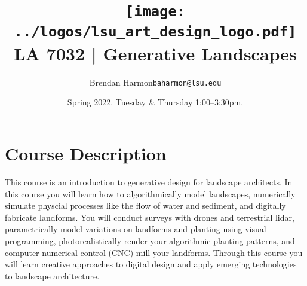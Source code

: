 \documentclass[11pt,article,oneside]{memoir}
\makeatletter
\def\myauthor{Author}
\def\mytitle{Title}
\def\myemail{baharmon@lsu.edu}
\def\myauthor{Brendan Harmon}
\def\mytitle{ \texttt{[image: ../logos/lsu\_art\_design\_logo.pdf]} \\[0.1cm] {\normalfont \normalsize LA 7032 |} \Large Generative Landscapes}
\newcommand{\globalcolor}[1]{%
  \color{#1}\global\let\default@color\current@color
}
\makeatother
\begin{document}
\setlength\bibitemsep{0.5em}

\setmainfont[Scale=1, Path = ../fonts/lato/,BoldItalicFont=Lato-RegIta,BoldFont=Lato-Reg,ItalicFont=Lato-LigIta]{Lato-Lig}
\setsansfont[Scale=1, Path = ../fonts/lato/,BoldItalicFont=Lato-RegIta,BoldFont=Lato-Reg,ItalicFont=Lato-LigIta]{Lato-Lig}
\setmonofont[Mapping=tex-text,Scale=0.8,Path = ../fonts/inconsolata/]{i}

\def\ind{\hangindent=1 true cm\hangafter=1 \noindent}
\def\labelitemi{$\cdot$}

\title{\LARGE \mytitle}
\author{\Large\myauthor \newline \footnotesize\texttt{\noindent\myemail}}
\date{Spring 2022. \newline Tuesday \& Thursday 1:00--3:30pm.} %
\published{\,}


\globalcolor{black}
\vspace*{-10em}
\maketitle
{}
\clearpage



\globalcolor{black}

\vspace*{-10em}
\maketitle

\section{Course Description}

This course is an introduction to 
generative design for landscape architects.
%
In this course you will learn how to 
algorithmically model landscapes,
numerically simulate physcial processes 
like the flow of water and sediment,
and digitally fabricate landforms.  
%
You will conduct surveys with drones and terrestrial lidar,
parametrically model variations on landforms and planting
using visual programming, 
photorealistically render your algorithmic planting patterns,
and computer numerical control (CNC) mill your landforms. 
%
Through this course you will 
learn creative approaches to digital design 
and apply emerging technologies to landscape architecture.
\\
\end{document}
